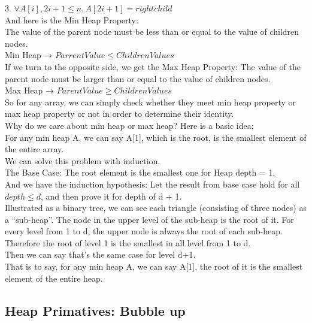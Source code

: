 \documentclass{article}
\begin{document}
{3. $\forall A[i],2i+1 \leq n,A[2i+1] = rightchild$\\
And here is the Min Heap Property:\\
The value of the parent node must be less than or equal to the value of children nodes.\\
Min Heap → $ParrentValue \leq ChildrenValues$\\
If we turn to the opposite side, we get the Max Heap Property: The value of the parent node must be larger than or equal to the value of children nodes.\\
Max Heap → $ParentValue \geq ChildrenValues$\\
So for any array, we can simply check whether they meet min heap property or max heap property or not in order to determine their identity.\\
Why do we care about min heap or max heap? Here is a basic idea;\\
For any min heap A, we can say A[1], which is the root, is the smallest element of the entire array.\\
We can solve this problem with induction.\\
The Base Case: The root element is the smallest one for Heap depth = 1.\\
And we have the induction hypothesis: Let the result from base case hold for all $depth \leq d$, and then prove it for depth of d + 1.\\
Illustrated as a binary tree, we can see each triangle (consisting of three nodes) as a “sub-heap”. The node in the upper level of the sub-heap is the root of it. 
For every level from 1 to d, the upper node is always the root of each sub-heap. Therefore the root of level 1 is the smallest in all level from 1 to d.\\
Then we can say that's the same case for level d+1.\\
That is to say, for any min heap A, we can say A[1], the root of it is the smallest element of the entire heap.}

\subsection{Heap Primatives: Bubble up}
\end{document}
